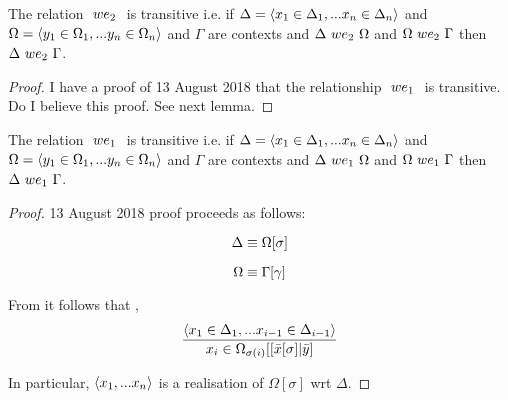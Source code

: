 \documentclass[10pt,a4paper]{scrartcl}
\begin{document}
\begin{lemma}
The relation $\ we_2\ $ is 
transitive i.e. if $\Delta=\langle x_1 \in \Delta_1,... x_{n} \in \Delta_{n}\rangle$ 
and $\Omega = \langle y_1 \in \Omega_1,... y_{n} \in \Omega_{n}\rangle$ and $\Gamma$ are contexts 
and $\Delta\ we_2\ \Omega$ 
and $\Omega\ we_2\ \Gamma$ then 
$\Delta\ we_2\ \Gamma$.
\end{lemma}
\begin{proof}
I have a proof of 13 August 2018  that the relationship $\ we_1\ $ is transitive. Do I believe this proof. See next lemma.

\end{proof}
\begin{lemma}
The relation $\ we_1\ $ is 
transitive i.e. if $\Delta=\langle x_1 \in \Delta_1,... x_{n} \in \Delta_{n}\rangle$ 
and $\Omega = \langle y_1 \in \Omega_1,... y_{n} \in \Omega_{n}\rangle$ and $\Gamma$ are contexts 
and $\Delta\ we_1\ \Omega$ 
and $\Omega\ we_1\ \Gamma$ then 
$\Delta\ we_1\ \Gamma$.
\end{lemma}
\begin{proof}
 13 August 2018  proof proceeds as follows:

\begin{equation}
\label{we1Transitive1}
\Delta \equiv \Omega[\sigma]
\end{equation}

\begin{equation}
\label{we1Transitive2}
\Omega \equiv \Gamma[\gamma]
\end{equation}

From  it follows that \foreachi,
\begin{equation}
\label{we1Transitive3}
\frac{\langle x_1 \in \Delta_1,... x_{i-1} \in \Delta_{i-1}\rangle}{x_i \in \Omega_{\sigma(i)}[[\bar{x}[\sigma]|\bar{y}]}
\end{equation}

In particular, $\langle x_1,...x_n\rangle$ is a realisation of $\Omega[\sigma]$ wrt $\Delta$.

\end{proof}
\end{document}
